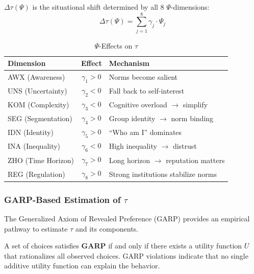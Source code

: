 \begin{definition}
\label{def:tau-context}
$\Delta\tau(\Psi)$ is the situational shift determined by all 8 $\Psi$-dimensions:
\begin{equation}
\Delta\tau(\Psi) = \sum_{j=1}^{8} \gamma_j \cdot \Psi_j
\end{equation}

\begin{table}[htbp]
\centering
\caption{$\Psi$-Effects on $\tau$}
\label{tab:psi-tau-effects}
\begin{tabular}{@{}lcl@{}}
\toprule
\textbf{Dimension} & \textbf{Effect} & \textbf{Mechanism} \\
\midrule
AWX (Awareness) & $\gamma_1 > 0$ & Norms become salient \\
UNS (Uncertainty) & $\gamma_2 < 0$ & Fall back to self-interest \\
KOM (Complexity) & $\gamma_3 < 0$ & Cognitive overload $\rightarrow$ simplify \\
SEG (Segmentation) & $\gamma_4 > 0$ & Group identity $\rightarrow$ norm binding \\
IDN (Identity) & $\gamma_5 > 0$ & ``Who am I'' dominates \\
INA (Inequality) & $\gamma_6 < 0$ & High inequality $\rightarrow$ distrust \\
ZHO (Time Horizon) & $\gamma_7 > 0$ & Long horizon $\rightarrow$ reputation matters \\
REG (Regulation) & $\gamma_8 > 0$ & Strong institutions stabilize norms \\
\bottomrule
\end{tabular}
\end{table}
\end{definition}

\subsubsection{GARP-Based Estimation of $\tau$}

The Generalized Axiom of Revealed Preference (GARP) provides an empirical pathway to estimate $\tau$ and its components.

\begin{definition}[GARP]
\label{def:garp}
A set of choices satisfies \textbf{GARP} if and only if there exists a utility function $U$ that rationalizes all observed choices. GARP violations indicate that no single additive utility function can explain the behavior.
\end{definition}

